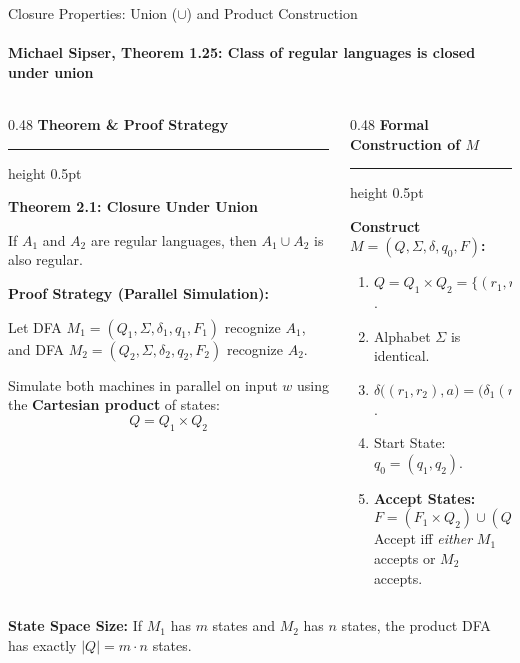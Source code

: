 \documentclass[aspectratio=169, 10pt]{beamer}
\newcommand{\colheader}[1]{%
  {\noindent\footnotesize\bfseries\color{gimpanavy}#1}%
  \vspace{0.02cm}%
  {\color{gimpanavy!30}\hrule height 0.5pt}%
  \vspace{0.05cm}%
}
\newcommand{\cardtitle}[1]{{\noindent\footnotesize\bfseries\color{gimpanavy}#1}\par\vspace{0.03cm}}
\newcommand{\greentitle}[1]{{\noindent\footnotesize\bfseries\color{accentGreen}#1}\par\vspace{0.03cm}}
\begin{document}
\begin{frame}{Closure Properties: Union ($\cup$) and Product Construction}
  \framesubtitle{Michael Sipser, Theorem 1.25: Class of regular languages is closed under union}
  
  \begin{columns}[T]
    \begin{column}{0.48\textwidth}
      \colheader{Theorem \& Proof Strategy}
      \begin{tcolorbox}[conceptcard]
        \cardtitle{Theorem 2.1: Closure Under Union}
        {\scriptsize
        If $A_1$ and $A_2$ are regular languages, then $A_1 \cup A_2$ is also regular.
        \vspace{0.06cm}
        
        \textbf{Proof Strategy (Parallel Simulation):}\par
        Let DFA $M_1 = (Q_1, \Sigma, \delta_1, q_1, F_1)$ recognize $A_1$, and DFA $M_2 = (Q_2, \Sigma, \delta_2, q_2, F_2)$ recognize $A_2$.\par
        Simulate both machines in parallel on input $w$ using the \textbf{Cartesian product} of states:
        \[ Q = Q_1 \times Q_2 \]
        }
      \end{tcolorbox}
    \end{column}
    
    \begin{column}{0.48\textwidth}
      \colheader{Formal Construction of $M$}
      \begin{tcolorbox}[examplecard]
        \greentitle{Construct $M = (Q, \Sigma, \delta, q_0, F)$:}
        \begin{enumerate}\setlength{\itemsep}{2pt}\scriptsize
          \item $Q = Q_1 \times Q_2 = \{(r_1, r_2) \mid r_1 \in Q_1, r_2 \in Q_2\}$.
          \item Alphabet $\Sigma$ is identical.
          \item $\delta\bigl((r_1, r_2), a\bigr) = \bigl(\delta_1(r_1, a), \delta_2(r_2, a)\bigr)$.
          \item Start State: $q_0 = (q_1, q_2)$.
          \item \textbf{Accept States:}
          \[ F = (F_1 \times Q_2) \cup (Q_1 \times F_2) \]
          Accept iff \textit{either} $M_1$ accepts or $M_2$ accepts.
        \end{enumerate}
      \end{tcolorbox}
    \end{column}
  \end{columns}
  
  \vspace{0.08cm}
  \begin{tcolorbox}[spotlightcard]
    {\scriptsize\textbf{State Space Size:} If $M_1$ has $m$ states and $M_2$ has $n$ states, the product DFA has exactly $|Q| = m \cdot n$ states.}
  \end{tcolorbox}
\end{frame}
\end{document}
